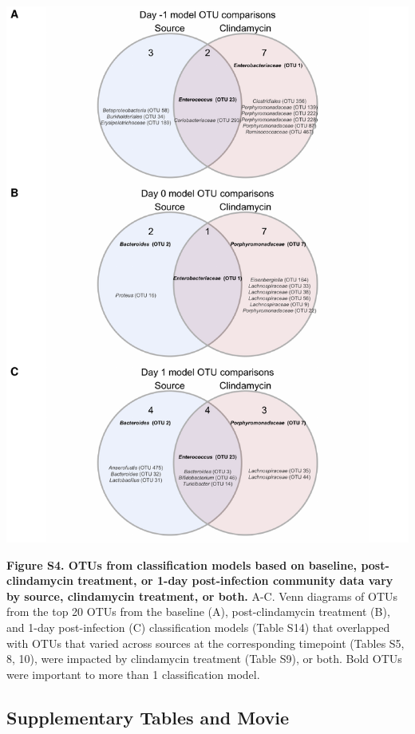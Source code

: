 \documentclass[
  11pt,
]{article}
\begin{document}
\includegraphics{figure_S4.pdf}

\textbf{Figure S4. OTUs from classification models based on baseline,
post-clindamycin treatment, or 1-day post-infection community data vary
by source, clindamycin treatment, or both.} A-C. Venn diagrams of OTUs
from the top 20 OTUs from the baseline (A), post-clindamycin treatment
(B), and 1-day post-infection (C) classification models (Table S14) that
overlapped with OTUs that varied across sources at the corresponding
timepoint (Tables S5, 8, 10), were impacted by clindamycin treatment
(Table S9), or both. Bold OTUs were important to more than 1
classification model.

\newpage

\hypertarget{supplementary-tables-and-movie}{%
\subsection{Supplementary Tables and
Movie}\label{supplementary-tables-and-movie}}
\end{document}
